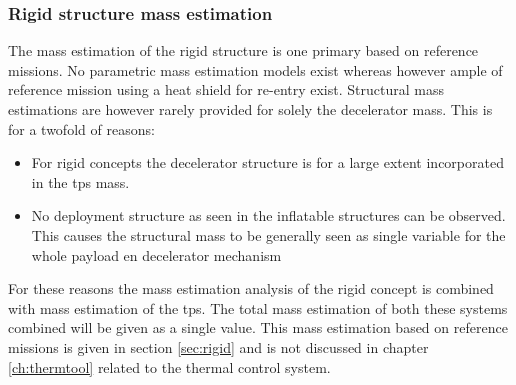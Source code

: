\subsubsection{Rigid structure mass estimation}

The mass estimation of the rigid structure is one primary based on reference missions. No parametric mass estimation models exist whereas however ample of reference mission using a heat shield for re-entry exist. Structural mass estimations are however rarely provided for solely the decelerator mass. This is for a twofold of reasons:

\begin{itemize}
\item For rigid concepts the decelerator structure is for a large extent incorporated in the \acrfull{tps} mass.
\item No deployment structure as seen in the inflatable structures can be observed. This causes the structural mass to be generally seen as single variable for the whole payload en decelerator mechanism
\end{itemize}

For these reasons the mass estimation analysis of the rigid concept is combined with mass estimation of the \acrfull{tps}. The total mass estimation of both these systems combined will be given as a single value. This mass estimation based on reference missions is given in section \ref{sec:rigid} and is not discussed in chapter \ref{ch:thermtool} related to the thermal control system.



